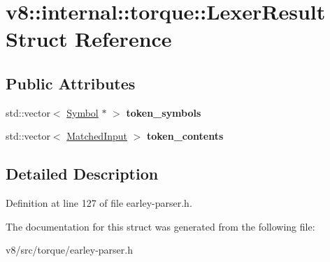 \hypertarget{structv8_1_1internal_1_1torque_1_1LexerResult}{}\section{v8\+:\+:internal\+:\+:torque\+:\+:Lexer\+Result Struct Reference}
\label{structv8_1_1internal_1_1torque_1_1LexerResult}
\subsection*{Public Attributes}
\begin{DoxyCompactItemize}
\item 
\mbox{\label{structv8_1_1internal_1_1torque_1_1LexerResult_a79142459c9df1ed5e351f84900e3d5a9}} 
std\+::vector$<$ \mbox{\hyperlink{classv8_1_1internal_1_1torque_1_1Symbol}{Symbol}} $\ast$ $>$ {\bfseries token\+\_\+symbols}
\item 
\mbox{\label{structv8_1_1internal_1_1torque_1_1LexerResult_a1ecfd75c817cbeb5b58c0d74074bee83}} 
std\+::vector$<$ \mbox{\hyperlink{structv8_1_1internal_1_1torque_1_1MatchedInput}{Matched\+Input}} $>$ {\bfseries token\+\_\+contents}
\end{DoxyCompactItemize}


\subsection{Detailed Description}


Definition at line 127 of file earley-\/parser.\+h.



The documentation for this struct was generated from the following file\+:\begin{DoxyCompactItemize}
\item 
v8/src/torque/earley-\/parser.\+h\end{DoxyCompactItemize}
